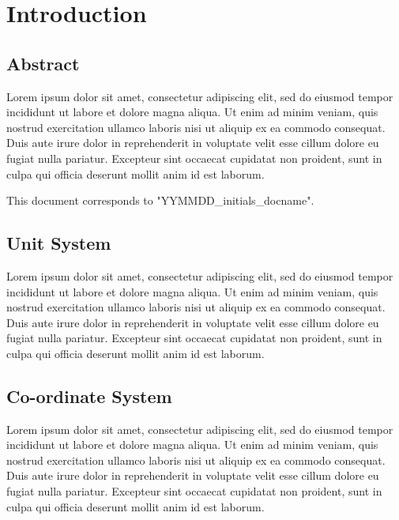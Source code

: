 \documentclass[12pt, a4paper, oneside]{book}
\begin{document}

\tableofcontents
\clearpage
\listoftables
\clearpage
\listoffigures
\clearpage

\chapter{Introduction}

\section{Abstract}
Lorem ipsum dolor sit amet, consectetur adipiscing elit, sed do eiusmod tempor incididunt ut labore et dolore magna aliqua. Ut enim ad minim veniam, quis nostrud exercitation ullamco laboris nisi ut aliquip ex ea commodo consequat. Duis aute irure dolor in reprehenderit in voluptate velit esse cillum dolore eu fugiat nulla pariatur. Excepteur sint occaecat cupidatat non proident, sunt in culpa qui officia deserunt mollit anim id est laborum.

\vspace*{1\baselineskip}

This document corresponds to "YYMMDD\_initials\_docname".

\section{Unit System}
Lorem ipsum dolor sit amet, consectetur adipiscing elit, sed do eiusmod tempor incididunt ut labore et dolore magna aliqua. Ut enim ad minim veniam, quis nostrud exercitation ullamco laboris nisi ut aliquip ex ea commodo consequat. Duis aute irure dolor in reprehenderit in voluptate velit esse cillum dolore eu fugiat nulla pariatur. Excepteur sint occaecat cupidatat non proident, sunt in culpa qui officia deserunt mollit anim id est laborum.

\section{Co-ordinate System}
Lorem ipsum dolor sit amet, consectetur adipiscing elit, sed do eiusmod tempor incididunt ut labore et dolore magna aliqua. Ut enim ad minim veniam, quis nostrud exercitation ullamco laboris nisi ut aliquip ex ea commodo consequat. Duis aute irure dolor in reprehenderit in voluptate velit esse cillum dolore eu fugiat nulla pariatur. Excepteur sint occaecat cupidatat non proident, sunt in culpa qui officia deserunt mollit anim id est laborum.
\end{document}
